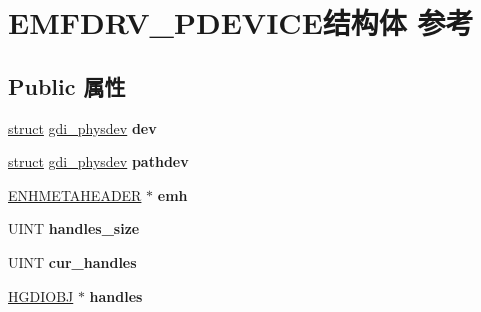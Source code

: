\hypertarget{struct_e_m_f_d_r_v___p_d_e_v_i_c_e}{}\section{E\+M\+F\+D\+R\+V\+\_\+\+P\+D\+E\+V\+I\+C\+E结构体 参考}
\label{struct_e_m_f_d_r_v___p_d_e_v_i_c_e}
\subsection*{Public 属性}
\begin{DoxyCompactItemize}
\item 
\mbox{\label{struct_e_m_f_d_r_v___p_d_e_v_i_c_e_aba519eea7f2a34e63bdbfc503313f841}} 
\hyperlink{interfacestruct}{struct} \hyperlink{structgdi__physdev}{gdi\+\_\+physdev} {\bfseries dev}
\item 
\mbox{\label{struct_e_m_f_d_r_v___p_d_e_v_i_c_e_ae9f5836ea1aaa385c8cf373adf0190fc}} 
\hyperlink{interfacestruct}{struct} \hyperlink{structgdi__physdev}{gdi\+\_\+physdev} {\bfseries pathdev}
\item 
\mbox{\label{struct_e_m_f_d_r_v___p_d_e_v_i_c_e_a6a5b4d044ba1c3364d763c12c0201157}} 
\hyperlink{structtag_e_n_h_m_e_t_a_h_e_a_d_e_r}{E\+N\+H\+M\+E\+T\+A\+H\+E\+A\+D\+ER} $\ast$ {\bfseries emh}
\item 
\mbox{\label{struct_e_m_f_d_r_v___p_d_e_v_i_c_e_a7b2ade79a15c6781c052bcecc5e650a6}} 
U\+I\+NT {\bfseries handles\+\_\+size}
\item 
\mbox{\label{struct_e_m_f_d_r_v___p_d_e_v_i_c_e_a1de49f619dc9c6462c9e7b2b7e15554b}} 
U\+I\+NT {\bfseries cur\+\_\+handles}
\item 
\mbox{\label{struct_e_m_f_d_r_v___p_d_e_v_i_c_e_a2047fd3ee29d34a618d16f74f245401d}} 
\hyperlink{interfacevoid}{H\+G\+D\+I\+O\+BJ} $\ast$ {\bfseries handles}
\item 
\mbox{\label{struct_e_m_f_d_r_v___p_d_e_v_i_c_e_aa43782ded067bc0a1fc73bdc153a83c0}} 

\end{DoxyCompactItemize}

